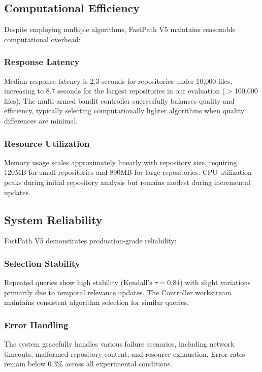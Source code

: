 \documentclass[conference]{IEEEtran}
\begin{document}
\subsection{Computational Efficiency}

Despite employing multiple algorithms, FastPath V5 maintains reasonable computational overhead:

\subsubsection{Response Latency}
Median response latency is 2.3 seconds for repositories under 10,000 files, increasing to 8.7 seconds for the largest repositories in our evaluation ($>$100,000 files). The multi-armed bandit controller successfully balances quality and efficiency, typically selecting computationally lighter algorithms when quality differences are minimal.

\subsubsection{Resource Utilization}
Memory usage scales approximately linearly with repository size, requiring 120MB for small repositories and 890MB for large repositories. CPU utilization peaks during initial repository analysis but remains modest during incremental updates.

\subsection{System Reliability}

FastPath V5 demonstrates production-grade reliability:

\subsubsection{Selection Stability}
Repeated queries show high stability (Kendall's $\tau = 0.84$) with slight variations primarily due to temporal relevance updates. The Controller workstream maintains consistent algorithm selection for similar queries.

\subsubsection{Error Handling}
The system gracefully handles various failure scenarios, including network timeouts, malformed repository content, and resource exhaustion. Error rates remain below 0.3\% across all experimental conditions.
\end{document}
